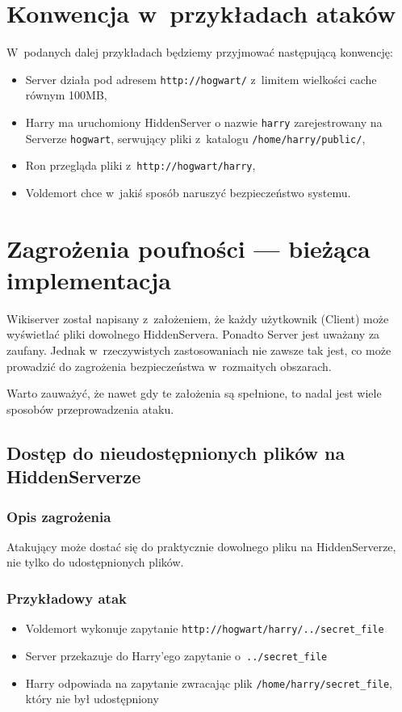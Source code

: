 \documentclass[a4paper,notitlepage]{article}
\begin{document}
\pagestyle{fancy}

\section{Konwencja w~przykładach ataków}
W~podanych dalej przykładach będziemy przyjmować następującą konwencję:
\begin{itemize}
\item Server działa pod adresem \texttt{http://hogwart/} 
z~limitem wielkości cache równym 100MB,
\item Harry ma uruchomiony HiddenServer o nazwie \texttt{harry} 
zarejestrowany na Serverze \texttt{hogwart},
serwujący pliki z~katalogu \texttt{/home/harry/public/},
\item Ron przegląda pliki z~\texttt{http://hogwart/harry},
\item Voldemort chce w~jakiś sposób naruszyć bezpieczeństwo systemu.
\end{itemize}

\section{Zagrożenia poufności --- bieżąca implementacja}
Wikiserver został napisany z~założeniem, że każdy użytkownik (Client) może
wyświetlać pliki dowolnego HiddenServera. Ponadto Server jest uważany 
za zaufany. Jednak w~rzeczywistych zastosowaniach nie zawsze tak jest, co
może prowadzić do zagrożenia bezpieczeństwa w~rozmaitych obszarach.

Warto zauważyć, że nawet gdy te założenia są spełnione, to nadal
jest wiele sposobów przeprowadzenia ataku. 

\subsection{Dostęp do nieudostępnionych plików na HiddenServerze}
\subsubsection*{Opis zagrożenia}
Atakujący może dostać się do praktycznie dowolnego pliku na HiddenServerze,
nie tylko do udostępnionych plików.
\subsubsection*{Przykładowy atak}
\begin{itemize}
\item Voldemort wykonuje zapytanie 
\texttt{http://hogwart/harry/../secret\_file}
\item Server przekazuje do Harry'ego zapytanie o~\texttt{../secret\_file}
\item Harry odpowiada na zapytanie zwracając plik 
\texttt{/home/harry/secret\_file}, który nie był udostępniony
\end{itemize}
\end{document}
